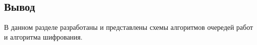 \begin{figure}[ht!]
\end{figure}

\subsection*{Вывод}

В данном разделе разработаны и представлены схемы алгоритмов очередей работ и алгоритма шифрования.